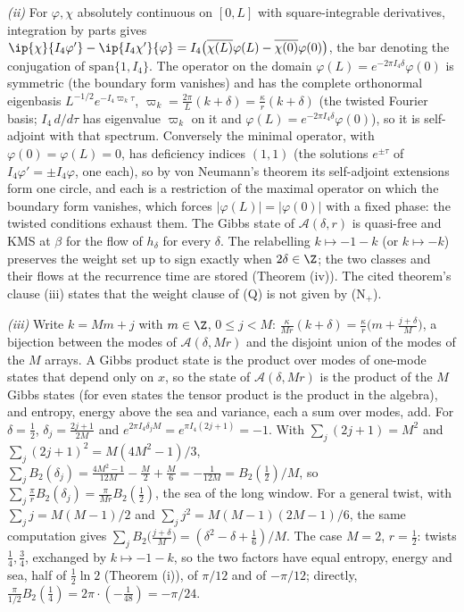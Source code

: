 \emph{(ii)} For $\varphi, \chi$ absolutely continuous on $[0, L]$ with square-integrable derivatives, integration by parts gives $\ip{\chi}{I_4\varphi'} - \ip{I_4\chi'}{\varphi} = I_4\bigl(\overline{\chi(L)}\varphi(L) - \overline{\chi(0)}\varphi(0)\bigr)$, the bar denoting the conjugation of $\mathrm{span}\{1, I_4\}$. The operator on the domain $\varphi(L) = e^{-2\pi I_4\delta}\varphi(0)$ is symmetric (the boundary form vanishes) and has the complete orthonormal eigenbasis $L^{-1/2}e^{-I_4\varpi_{k}\tau}$, $\varpi_{k} = \tfrac{2\pi}{L}(k + \delta) = \tfrac{\kappa}{r}(k + \delta)$ (the twisted Fourier basis; $I_4\,d/d\tau$ has eigenvalue $\varpi_{k}$ on it and $\varphi(L) = e^{-2\pi I_4\delta}\varphi(0)$), so it is self-adjoint with that spectrum. Conversely the minimal operator, with $\varphi(0) = \varphi(L) = 0$, has deficiency indices $(1, 1)$ (the solutions $e^{\pm\tau}$ of $I_4\varphi' = \pm I_4\varphi$, one each), so by von Neumann's theorem its self-adjoint extensions form one circle, and each is a restriction of the maximal operator on which the boundary form vanishes, which forces $|\varphi(L)| = |\varphi(0)|$ with a fixed phase: the twisted conditions exhaust them. The Gibbs state of $\mathcal{A}(\delta, r)$ is quasi-free and KMS at $\beta$ for the flow of $h_{\delta}$ for every $\delta$. The relabelling $k \mapsto -1 - k$ (or $k \mapsto -k$) preserves the weight set up to sign exactly when $2\delta \in \Z$; the two classes and their flows at the recurrence time are stored (Theorem (iv)). The cited theorem's clause (iii) states that the weight clause of (Q) is not given by (N$_{+}$).

\emph{(iii)} Write $k = Mm + j$ with $m \in \Z$, $0 \le j < M$: $\tfrac{\kappa}{Mr}(k + \delta) = \tfrac{\kappa}{r}\bigl(m + \tfrac{j + \delta}{M}\bigr)$, a bijection between the modes of $\mathcal{A}(\delta, Mr)$ and the disjoint union of the modes of the $M$ arrays. A Gibbs product state is the product over modes of one-mode states that depend only on $x$, so the state of $\mathcal{A}(\delta, Mr)$ is the product of the $M$ Gibbs states (for even states the tensor product is the product in the algebra), and entropy, energy above the sea and variance, each a sum over modes, add. For $\delta = \tfrac12$, $\delta_{j} = \tfrac{2j + 1}{2M}$ and $e^{2\pi I_4\delta_{j}M} = e^{\pi I_4(2j + 1)} = -1$. With $\sum_{j}(2j + 1) = M^{2}$ and $\sum_{j}(2j + 1)^{2} = M(4M^{2} - 1)/3$, $\sum_{j}B_{2}(\delta_{j}) = \tfrac{4M^{2} - 1}{12M} - \tfrac{M}{2} + \tfrac{M}{6} = -\tfrac{1}{12M} = B_{2}(\tfrac12)/M$, so $\sum_{j}\tfrac{\pi}{r}B_{2}(\delta_{j}) = \tfrac{\pi}{Mr}B_{2}(\tfrac12)$, the sea of the long window. For a general twist, with $\sum_{j}j = M(M - 1)/2$ and $\sum_{j}j^{2} = M(M - 1)(2M - 1)/6$, the same computation gives $\sum_{j}B_{2}\bigl(\tfrac{j + \delta}{M}\bigr) = (\delta^{2} - \delta + \tfrac16)/M$. The case $M = 2$, $r = \tfrac12$: twists $\tfrac14, \tfrac34$, exchanged by $k \mapsto -1 - k$, so the two factors have equal entropy, energy and sea, half of $\tfrac12\ln 2$ (Theorem (i)), of $\pi/12$ and of $-\pi/12$; directly, $\tfrac{\pi}{1/2}B_{2}(\tfrac14) = 2\pi\cdot(-\tfrac{1}{48}) = -\pi/24$.

